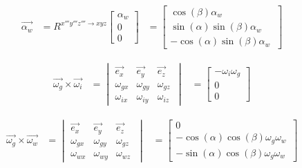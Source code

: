 \begin{equation*}
\begin{split}
\overrightarrow{\alpha_{w}}&=R^{x'''y'''z''' \rightarrow xyz}
	\begin{bmatrix}
	\alpha_{w}\\
	0\\
	0\
	\end{bmatrix}
	&=\begin{bmatrix}
	\cos(\beta)\alpha_{w}\\
	\sin(\alpha)\sin(\beta)\alpha_{w}\\
	-\cos(\alpha)\sin(\beta)\alpha_{w}\
	\end{bmatrix}
\end{split}
\end{equation*}

\begin{equation*}
\begin{split}
\overrightarrow{\omega_{g}}\times\overrightarrow{\omega_{i}}
&=	\begin{vmatrix}
	\overrightarrow{e_{x}} & \overrightarrow{e_{y}} & \overrightarrow{e_{z}}\\
	\omega_{gx} & \omega_{gy} & \omega_{gz}\\
	\omega_{ix} & \omega_{iy} & \omega_{iz}\
	\end{vmatrix}
&=	\begin{bmatrix}
	-\omega_{i}\omega_{g}\\
	0\\
	0\
\end{bmatrix}
\end{split}
\end{equation*}

\begin{equation*}
\begin{split}
\overrightarrow{\omega_{g}}\times\overrightarrow{\omega_{w}}
&=	\begin{vmatrix}
	\overrightarrow{e_{x}} & \overrightarrow{e_{y}} & \overrightarrow{e_{z}}\\
	\omega_{gx} & \omega_{gy} & \omega_{gz}\\
	\omega_{wx} & \omega_{wy} & \omega_{wz}\
	\end{vmatrix}
&=	\begin{bmatrix}
	0\\
	-\cos(\alpha)\cos(\beta)\omega_{g}\omega_{w}\\
	-\sin(\alpha)\cos(\beta)\omega_{g}\omega_{w}\
	\end{bmatrix}
\end{split}
\end{equation*}

